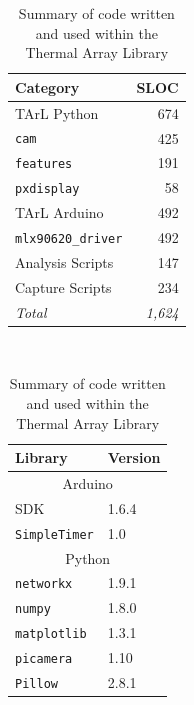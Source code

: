 \documentclass[../thesis/thesis.tex]{subfiles}
\begin{document}
\begin{table}
\centering
\begin{subtable}[b]{0.5\textwidth}
\centering
\begin{tabular}{|l|r|}
\hline
\textbf{Category} & \textbf{SLOC}  \\ \hline
TArL Python       & 674            \\ \hline
\hspace{5mm}\texttt{cam}        & 425           \\ \hline
\hspace{5mm}\texttt{features}   & 191           \\ \hline
\hspace{5mm}\texttt{pxdisplay}  & 58            \\ \hline
TArL Arduino  & 492            \\ \hline
\hspace{5mm}\texttt{mlx90620\_driver}  & 492          \\ \hline
Analysis Scripts  & 147            \\ \hline
Capture Scripts   & 234            \\ \hline
\textit{Total}    & \textit{1,624} \\ \hline
\end{tabular}
\caption{Source Lines Of Code written}
\end{subtable}%
~%
\begin{subtable}[b]{0.5\textwidth}
\centering
\begin{tabular}{|l|l|}
\hline
\textbf{Library}     & \multicolumn{1}{l|}{\textbf{Version}} \\ \hline
\multicolumn{2}{|c|}{Arduino}                                \\ \hline
SDK                  & 1.6.4                                 \\ \hline
\texttt{SimpleTimer} & 1.0                                   \\ \hline
\multicolumn{2}{|c|}{Python}                                 \\ \hline
\texttt{networkx}    & 1.9.1                                 \\ \hline
\texttt{numpy}       & 1.8.0                                 \\ \hline
\texttt{matplotlib}  & 1.3.1                                 \\ \hline
\texttt{picamera}    & 1.10                                  \\ \hline
\texttt{Pillow}      & 2.8.1                                 \\ \hline
\end{tabular}
\caption{Libraries used}
\end{subtable}
\caption{Summary of code written and used within the Thermal Array Library}
\end{table}
\end{document}
